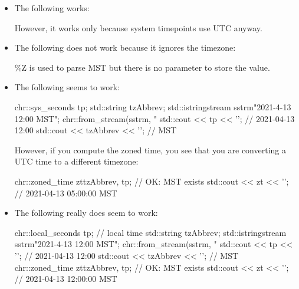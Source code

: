 \begin{itemize}
\item 
The following works:


However, it works only because system timepoints use UTC anyway.

\item
The following does not work because it ignores the timezone:


\%Z is used to parse MST but there is no parameter to store the value.

\item
The following seems to work:

\begin{cpp}
chr::sys_seconds tp;
std::string tzAbbrev;
std::istringstream sstrm{"2021-4-13 12:00 MST"};
chr::from_stream(sstrm, "%
std::cout << tp << '\n'; // 2021-04-13 12:00
std::cout << tzAbbrev << '\n'; // MST
\end{cpp}

However, if you compute the zoned time, you see that you are converting a UTC time to a different timezone:

\begin{cpp}
chr::zoned_time zt{tzAbbrev, tp}; // OK: MST exists
std::cout << zt << '\n'; // 2021-04-13 05:00:00 MST
\end{cpp}

\item
The following really does seem to work:

\begin{cpp}
chr::local_seconds tp; // local time
std::string tzAbbrev;
std::istringstream sstrm{"2021-4-13 12:00 MST"};
chr::from_stream(sstrm, "%
std::cout << tp << '\n'; // 2021-04-13 12:00
std::cout << tzAbbrev << '\n'; // MST
chr::zoned_time zt{tzAbbrev, tp}; // OK: MST exists
std::cout << zt << '\n'; // 2021-04-13 12:00:00 MST
\end{cpp}


\end{itemize}
